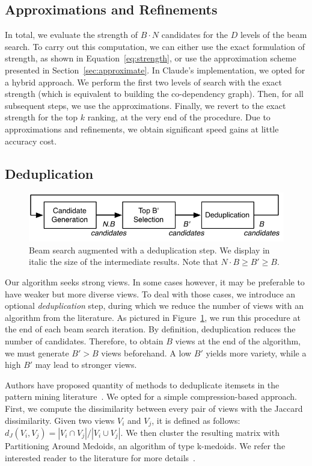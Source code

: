 \subsection{Approximations and Refinements}
In total, we evaluate the strength of $B \cdot N$ candidates for the $D$
levels of the beam search. To carry out this computation,  we can either use
the exact formulation of strength, as shown in Equation~\ref{eq:strength}, or
use the approximation scheme presented in Section~\ref{sec:approximate}. In
Claude's implementation, we opted for a hybrid approach. We perform the first
two levels of search with the exact strength (which is equivalent to building
the co-dependency graph).  Then, for all subsequent steps, we use the
approximations. Finally, we revert to the exact strength for the top $k$
ranking, at the very end of the procedure. Due to approximations and refinements, we
obtain significant speed gains at little accuracy cost.

\subsection{Deduplication}
\label{sec:variety}

\begin{figure}[t!]
\centering
\includegraphics[width=\columnwidth]{images/deduplication}
\caption{Beam search augmented with a deduplication step. We display in italic
the size of the intermediate results. Note that $N \cdot B \geq B' \geq B$.}
\label{pic:deduplication}
\end{figure}
Our algorithm seeks strong views. In some cases however, it may be preferable
to have weaker but more diverse views. To deal with those cases, we introduce
an optional \emph{deduplication} step, during which we reduce the number of
views with an algorithm from the literature. As pictured in
Figure~\ref{pic:deduplication}, we run this procedure at the end of each
beam search iteration.  By definition, deduplication reduces the number
of candidates. Therefore, to obtain $B$ views at the end of the algorithm, we
must generate $B' > B$ views beforehand. A low $B'$ yields more variety,
while a high $B'$ may lead to stronger views.

Authors have proposed quantity of methods to deduplicate itemsets in the
pattern mining literature~\cite{xin2005mining, van2006compression}. We opted
for a simple compression-based approach. First, we compute the dissimilarity
between every pair of views with the Jaccard dissimilarity. Given two views
$V_i$ and $V_j$, it is defined as follows: $d_J(V_i, V_j) = |V_i \cap V_j | / |
V_i \cup V_j |$. We then cluster the resulting matrix with Partitioning Around
Medoids, an algorithm of type k-medoids.  We refer the interested reader to the
literature for more details~\cite{kaufman2009finding}.






